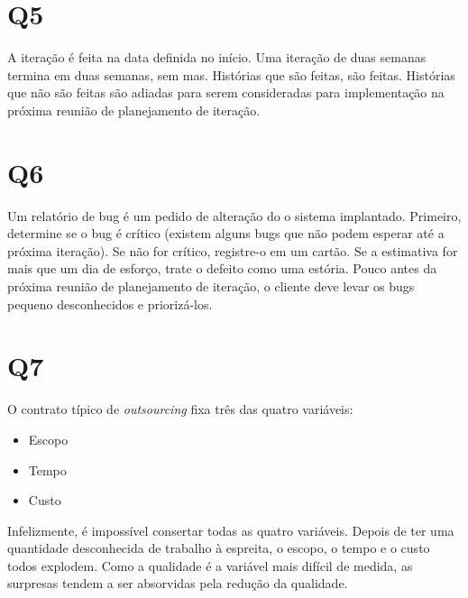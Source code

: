 \documentclass[11pt]{article}
\begin{document}
\section{Q5}
\label{sec:orgbcf3b63}

A iteração é feita na data definida no início. Uma iteração de duas semanas termina em
duas semanas, sem mas. Histórias que são feitas, são feitas. Histórias que não são
feitas são adiadas para serem consideradas para implementação na próxima reunião de
planejamento de iteração.

\section{Q6}
\label{sec:org8fd4d71}

Um relatório de bug é um pedido de alteração do o sistema implantado. Primeiro, 
determine se o bug é crítico (existem alguns bugs que não podem esperar até a próxima
iteração). Se não for crítico, registre-o em um cartão. Se a estimativa for mais que um
dia de esforço, trate o defeito como uma estória. Pouco antes da próxima reunião de
planejamento de iteração, o cliente deve levar os bugs pequeno desconhecidos e
priorizá-los.

\section{Q7}
\label{sec:org52834c7}

O contrato típico de \emph{outsourcing} fixa três das quatro variáveis:
\begin{itemize}
\item Escopo
\item Tempo
\item Custo
\end{itemize}

Infelizmente, é impossível consertar todas as quatro variáveis. Depois de ter uma
quantidade desconhecida de trabalho à espreita, o escopo, o tempo e o custo todos
explodem. Como a qualidade é a variável mais difícil de medida, as surpresas tendem a
ser absorvidas pela redução da qualidade.
\end{document}
